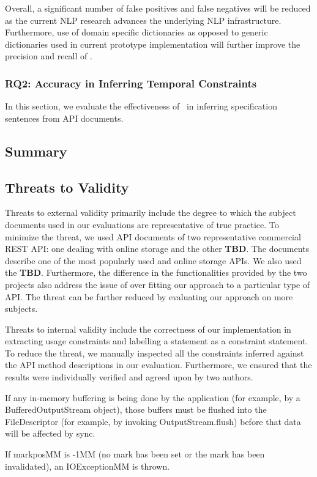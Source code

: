 Overall, a significant number of false positives and false negatives will be reduced as the current NLP research advances the underlying NLP infrastructure. Furthermore, use of domain specific dictionaries as opposed to generic dictionaries used in current prototype implementation will further improve the precision and recall of \tool. 

\subsubsection{RQ2: Accuracy in Inferring Temporal Constraints}

In this section, we evaluate the effectiveness of \tool\ in inferring specification sentences from API documents.

\subsection{Summary}
\label{sub:summary}



\subsection{Threats to Validity}
\label{sub:threats_to_validity}
Threats to external validity primarily include the degree to which the subject documents used in our evaluations are representative of true practice. To minimize the threat, we used API documents of two representative commercial REST API: one dealing with online storage and the other \textbf{TBD}. The \amazon documents describe one of the most popularly used and online storage APIs. We also used the \textbf{TBD}. Furthermore, the difference in the functionalities provided by the two projects also address the issue of over fitting our approach to a particular type of API. The threat can be further reduced by evaluating our approach on more subjects. 

Threats to internal validity include the correctness of our implementation in extracting usage constraints and labelling a statement as a constraint statement. To reduce the threat, we manually inspected all the constraints inferred against the API method descriptions in our evaluation. Furthermore, we ensured that the results were individually verified and agreed
upon by two authors.

If any in-memory buffering is being done by the application (for example, by a BufferedOutputStream object), those buffers must be flushed into the FileDescriptor (for example, by invoking OutputStream.flush) before that data will be affected by sync.


If markposMM is -1MM (no mark has been set or the mark has been invalidated), an IOExceptionMM is thrown.
